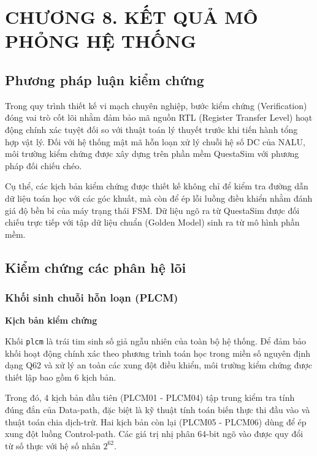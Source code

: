 \clearpage
\section*{CHƯƠNG 8. KẾT QUẢ MÔ PHỎNG HỆ THỐNG}
\setcounter{section}{8}
\setcounter{subsection}{0}
\setcounter{figure}{0}
\setcounter{table}{0}

\subsection{Phương pháp luận kiểm chứng}
Trong quy trình thiết kế vi mạch chuyên nghiệp, bước kiểm chứng (Verification) đóng vai trò cốt lõi nhằm đảm bảo mã nguồn RTL (Register Transfer Level) hoạt động chính xác tuyệt đối so với thuật toán lý thuyết trước khi tiến hành tổng hợp vật lý. Đối với hệ thống mật mã hỗn loạn xử lý chuỗi hệ số DC của NALU, môi trường kiểm chứng được xây dựng trên phần mềm QuestaSim với phương pháp đối chiếu chéo. 

Cụ thể, các kịch bản kiểm chứng được thiết kế không chỉ để kiểm tra đường dẫn dữ liệu toán học với các góc khuất, mà còn để ép lỗi luồng điều khiển nhằm đánh giá độ bền bỉ của máy trạng thái FSM. Dữ liệu ngõ ra từ QuestaSim được đối chiếu trực tiếp với tập dữ liệu chuẩn (Golden Model) sinh ra từ mô hình phần mềm.

\subsection{Kiểm chứng các phân hệ lõi}
\subsubsection{Khối sinh chuỗi hỗn loạn (PLCM)}

\textbf{Kịch bản kiểm chứng}

Khối \texttt{plcm} là trái tim sinh số giả ngẫu nhiên của toàn bộ hệ thống. Để đảm bảo khối hoạt động chính xác theo phương trình toán học trong miền số nguyên định dạng Q62 và xử lý an toàn các xung đột điều khiển, môi trường kiểm chứng được thiết lập bao gồm 6 kịch bản. 

Trong đó, 4 kịch bản đầu tiên (PLCM01 - PLCM04) tập trung kiểm tra tính đúng đắn của Data-path, đặc biệt là kỹ thuật tính toán biến thực thi đầu vào và thuật toán chia dịch-trừ. Hai kịch bản còn lại (PLCM05 - PLCM06) dùng để ép xung đột luồng Control-path. Các giá trị nhị phân 64-bit ngõ vào được quy đổi từ số thực với hệ số nhân $2^{62}$.

